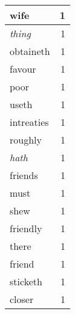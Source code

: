 \begin{center}
\begin{longtable}{l|r}
wife & 1\\ \hline 
\emph{thing} & 1\\ \hline 
obtaineth & 1\\ \hline 
favour & 1\\ \hline 
poor & 1\\ \hline 
useth & 1\\ \hline 
intreaties & 1\\ \hline 
roughly & 1\\ \hline 
\emph{hath} & 1\\ \hline 
friends & 1\\ \hline 
must & 1\\ \hline 
shew & 1\\ \hline 
friendly & 1\\ \hline 
there & 1\\ \hline 
friend & 1\\ \hline 
sticketh & 1\\ \hline 
closer & 1\\ \hline 
\end{longtable}  
\end{center}  


  
\normalsize  

  
  


